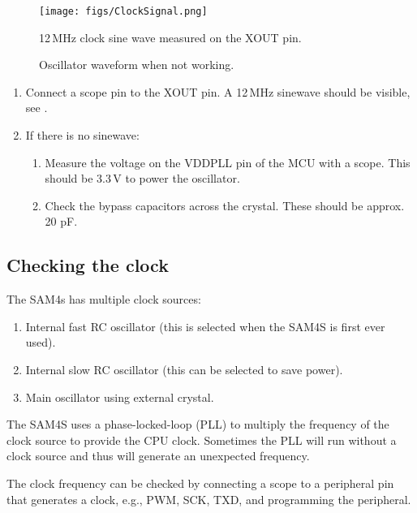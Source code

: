 \begin{figure}[!h]
\centering
\texttt{[image: figs/ClockSignal.png]}
\caption{12\,MHz clock sine wave measured on the XOUT pin.}
\label{fig:xout}
\end{figure}

\begin{figure}[!h]
  \centering
  \caption{Oscillator waveform when not working.}
\end{figure}

\begin{enumerate}
\item Connect a scope pin to the XOUT pin. A 12\,MHz sinewave should
  be visible, see .

\item If there is no sinewave:

  \begin{enumerate}
  \item Measure the voltage on the VDDPLL pin of the MCU with a
    scope. This should be 3.3\,V to power the oscillator.

  \item Check the bypass capacitors across the crystal.  These should
    be approx. 20 pF.
  \end{enumerate}
\end{enumerate}


\subsection{Checking the clock}
\label{checking-the-clock}

The SAM4s has multiple clock sources:

\begin{enumerate}
\item
  Internal fast RC oscillator (this is selected when the SAM4S is first
  ever used).
\item
  Internal slow RC oscillator (this can be selected to save power).
\item
  Main oscillator using external crystal.
\end{enumerate}

The SAM4S uses a phase-locked-loop (PLL) to multiply the frequency of
the clock source to provide the CPU clock. Sometimes the PLL will run
without a clock source and thus will generate an unexpected frequency.

The clock frequency can be checked by connecting a scope to a
peripheral pin that generates a clock, e.g., PWM, SCK, TXD, and
programming the peripheral.



